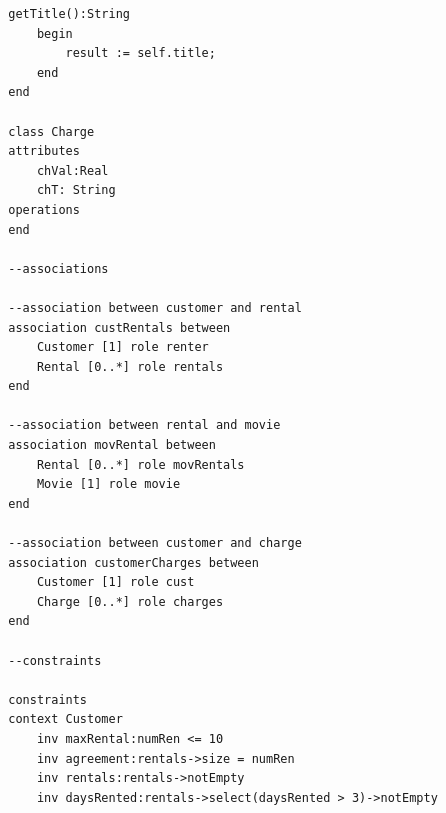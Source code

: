 \documentclass{article}
\begin{document}
\begin{Verbatim}
		getTitle():String
			begin
				result := self.title;
			end
		end
		
		class Charge
		attributes
			chVal:Real
			chT: String
		operations
		end
		
		--associations
		
		--association between customer and rental
		association custRentals between
			Customer [1] role renter
			Rental [0..*] role rentals
		end
		
		--association between rental and movie
		association movRental between
			Rental [0..*] role movRentals
			Movie [1] role movie
		end
		
		--association between customer and charge
		association customerCharges between
			Customer [1] role cust
			Charge [0..*] role charges
		end
		
		--constraints
		
		constraints
		context Customer
			inv maxRental:numRen <= 10
			inv agreement:rentals->size = numRen
			inv rentals:rentals->notEmpty
			inv daysRented:rentals->select(daysRented > 3)->notEmpty
	\end{Verbatim}
	
\end{document}
